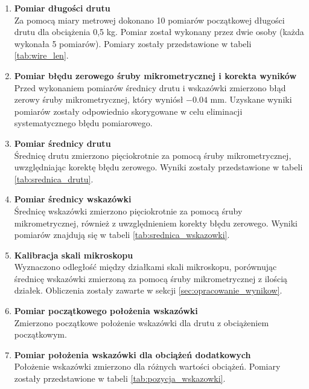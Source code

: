 \documentclass[a4paper,12pt]{article}
\begin{document}
\begin{enumerate}
    \item \textbf{Pomiar długości drutu} \\
          Za pomocą miary metrowej dokonano 10 pomiarów początkowej długości drutu dla obciążenia 0,5 kg. Pomiar został wykonany przez dwie osoby (każda wykonała 5 pomiarów). Pomiary zostały przedstawione w tabeli \ref{tab:wire_len}.

    \item \textbf{Pomiar błędu zerowego śruby mikrometrycznej i korekta wyników} \\
          Przed wykonaniem pomiarów średnicy drutu i wskazówki zmierzono błąd zerowy śruby mikrometrycznej, który wyniósł \(-0.04\) mm. Uzyskane wyniki pomiarów zostały odpowiednio skorygowane w celu eliminacji systematycznego błędu pomiarowego.

    \item \textbf{Pomiar średnicy drutu} \\
          Średnicę drutu zmierzono pięciokrotnie za pomocą śruby mikrometrycznej, uwzględniając korektę błędu zerowego. Wyniki zostały przedstawione w tabeli \ref{tab:srednica_drutu}.

    \item \textbf{Pomiar średnicy wskazówki} \\
          Średnicę wskazówki zmierzono pięciokrotnie za pomocą śruby mikrometrycznej, również z uwzględnieniem korekty błędu zerowego. Wyniki pomiarów znajdują się w tabeli \ref{tab:srednica_wskazowki}.

    \item \textbf{Kalibracja skali mikroskopu} \\
          Wyznaczono odległość między działkami skali mikroskopu, porównując średnicę wskazówki zmierzoną za pomocą śruby mikrometrycznej z ilością działek. Obliczenia zostały zawarte w sekcji \ref{sec:opracowanie_wynikow}.

    \item \textbf{Pomiar początkowego położenia wskazówki} \\
          Zmierzono początkowe położenie wskazówki dla drutu z obciążeniem początkowym.

    \item \textbf{Pomiar położenia wskazówki dla obciążeń dodatkowych} \\
          Położenie wskazówki zmierzono dla różnych wartości obciążeń. Pomiary zostały przedstawione w tabeli \ref{tab:pozycja_wskazowki}.
\end{enumerate}
\end{document}

